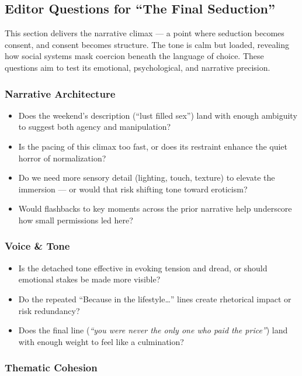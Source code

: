 \medskip

\subsection*{Editor Questions for ``The Final Seduction''}

This section delivers the narrative climax — a point where seduction becomes consent, and consent becomes structure. The tone is calm but loaded, revealing how social systems mask coercion beneath the language of choice. These questions aim to test its emotional, psychological, and narrative precision.

\subsubsection*{Narrative Architecture}

\begin{itemize}
  \item Does the weekend’s description (``lust filled sex'') land with enough ambiguity to suggest both agency and manipulation?
  \item Is the pacing of this climax too fast, or does its restraint enhance the quiet horror of normalization?
  \item Do we need more sensory detail (lighting, touch, texture) to elevate the immersion — or would that risk shifting tone toward eroticism?
  \item Would flashbacks to key moments across the prior narrative help underscore how small permissions led here?
\end{itemize}

\subsubsection*{Voice \& Tone}

\begin{itemize}
  \item Is the detached tone effective in evoking tension and dread, or should emotional stakes be made more visible?
  \item Do the repeated ``Because in the lifestyle…'' lines create rhetorical impact or risk redundancy?
  \item Does the final line (\textit{“you were never the only one who paid the price”}) land with enough weight to feel like a culmination?
\end{itemize}

\subsubsection*{Thematic Cohesion}

